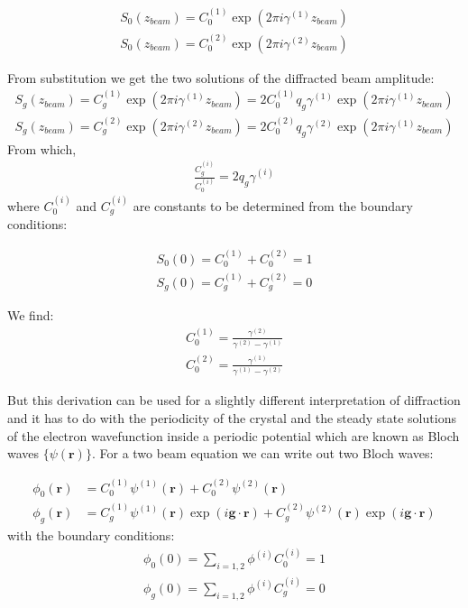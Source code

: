 \begin{align*}
S_0(z_{beam}) = C_0^{(1)} \exp{(2\pi i \gamma^{(1)}z_{beam})} \\
S_0(z_{beam}) = C_0^{(2)} \exp{(2\pi i \gamma^{(2)}z_{beam})}
\end{align*}

From substitution we get the two solutions of the diffracted beam amplitude:
\begin{align*}
S_g(z_{beam}) = C_g^{(1)} \exp{(2\pi i \gamma^{(1)}z_{beam})} = 2C_0^{(1)}q_g\gamma^{(1)} \exp{(2\pi i \gamma^{(1)}z_{beam}) }\\
S_g(z_{beam}) = C_g^{(2)} \exp{(2\pi i \gamma^{(2)}z_{beam})} = 2C_0^{(2)}q_g\gamma^{(2)} \exp{(2\pi i \gamma^{(1)}z_{beam}) }
\end{align*}
From which, 
\begin{align*}
\frac{C_g^{(i)}}{C_0^{(i)}}=2 q_g \gamma^{(i)}
\end{align*}
where $C_0^{(i)}$ and $C_g^{(i)}$ are constants to be determined from the boundary conditions:

\begin{align*}
S_0(0) = C_0^{(1)} + C_0^{(2)} =1\\
S_g(0) = C_g^{(1)} + C_g^{(2)} =0 
\end{align*}

We find:
\begin{align}
C_0^{(1)} = \frac{\gamma^{(2)}}{\gamma^{(2)}-\gamma^{(1)}}\\
C_0^{(2)} = \frac{\gamma^{(1)}}{\gamma^{(1)}-\gamma^{(2)}}
\end{align}



But this derivation can be used for a slightly different interpretation of diffraction and it has to do with the periodicity of the crystal and the steady state solutions of the  electron wavefunction inside a periodic potential which are known as Bloch waves $\{\psi(\textbf{r})\}$. For a two beam equation we can write out two Bloch waves:

\begin{align}
\phi_0(\textbf{r}) & =C_0^{(1)}\psi^{(1)}(\textbf{r})+C_0^{(2)}\psi^{(2)}(\textbf{r})\\
\phi_g(\textbf{r}) &=C_g^{(1)}\psi^{(1)}(\textbf{r})\exp(i\textbf{g}\cdot \textbf{r})+C_g^{(2)}\psi^{(2)}(\textbf{r})\exp(i\textbf{g}\cdot \textbf{r})
\end{align}
with the boundary conditions:
\begin{align}
\phi_0(0) =\sum_{i=1,2}\phi^{(i)}C_0^{(i)}=1 \\
\phi_g(0) =\sum_{i=1,2}\phi^{(i)}C_g^{(i)}=0
\end{align}

